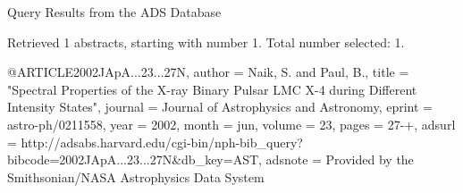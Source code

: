 Query Results from the ADS Database


Retrieved 1 abstracts, starting with number 1.  Total number selected: 1.

@ARTICLE{2002JApA...23...27N,
   author = {{Naik}, S. and {Paul}, B.},
    title = "{Spectral Properties of the X-ray Binary Pulsar LMC X-4 during Different Intensity States}",
  journal = {Journal of Astrophysics and Astronomy},
   eprint = {astro-ph/0211558},
     year = 2002,
    month = jun,
   volume = 23,
    pages = {27-+},
   adsurl = {http://adsabs.harvard.edu/cgi-bin/nph-bib_query?bibcode=2002JApA...23...27N&db_key=AST},
  adsnote = {Provided by the Smithsonian/NASA Astrophysics Data System}
}


